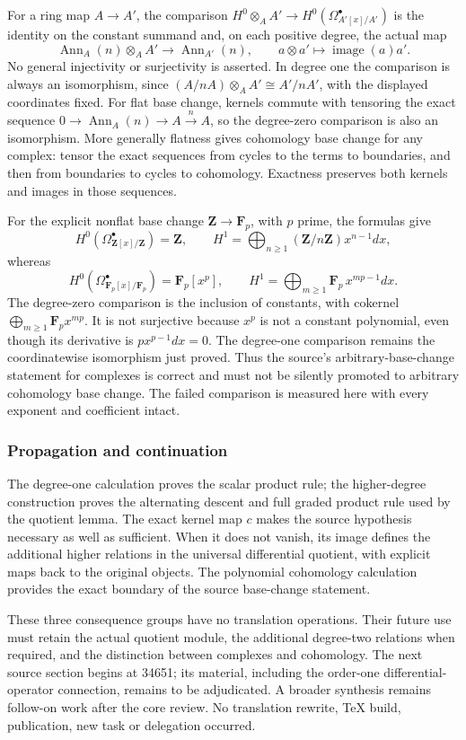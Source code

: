 For a ring map \(A\to A'\), the comparison \(H^0\otimes_A A'\to H^0(\Omega_{A'[x]/A'}^\bullet)\) is the identity on the constant summand and, on each positive degree, the actual map \[
\operatorname{Ann}_A(n)\otimes_A A'\longrightarrow\operatorname{Ann}_{A'}(n),\qquad a\otimes a'\longmapsto\operatorname{image}(a)a'.
\] No general injectivity or surjectivity is asserted. In degree one the comparison is always an isomorphism, since \((A/nA)\otimes_A A'\cong A'/nA'\), with the displayed coordinates fixed. For flat base change, kernels commute with tensoring the exact sequence \(0\to\operatorname{Ann}_A(n)\to A\xrightarrow n A\), so the degree-zero comparison is also an isomorphism. More generally flatness gives cohomology base change for any complex: tensor the exact sequences from cycles to the terms to boundaries, and then from boundaries to cycles to cohomology. Exactness preserves both kernels and images in those sequences.

For the explicit nonflat base change \(\mathbf Z\to\mathbf F_p\), with \(p\) prime, the formulas give \[
H^0(\Omega_{\mathbf Z[x]/\mathbf Z}^\bullet)=\mathbf Z,
\qquad H^1=\bigoplus_{n\ge1}(\mathbf Z/n\mathbf Z)x^{n-1}dx,
\] whereas \[
H^0(\Omega_{\mathbf F_p[x]/\mathbf F_p}^\bullet)=\mathbf F_p[x^p],
\qquad H^1=\bigoplus_{m\ge1}\mathbf F_p\,x^{mp-1}dx.
\] The degree-zero comparison is the inclusion of constants, with cokernel \(\bigoplus_{m\ge1}\mathbf F_p x^{mp}\). It is not surjective because \(x^p\) is not a constant polynomial, even though its derivative is \(p x^{p-1}dx=0\). The degree-one comparison remains the coordinatewise isomorphism just proved. Thus the source's arbitrary-base-change statement for complexes is correct and must not be silently promoted to arbitrary cohomology base change. The failed comparison is measured here with every exponent and coefficient intact.

\subsubsection{Propagation and continuation}\label{algebra-proof-042-propagation-and-continuation}

The degree-one calculation proves the scalar product rule; the higher-degree construction proves the alternating descent and full graded product rule used by the quotient lemma. The exact kernel map \(c\) makes the source hypothesis necessary as well as sufficient. When it does not vanish, its image defines the additional higher relations in the universal differential quotient, with explicit maps back to the original objects. The polynomial cohomology calculation provides the exact boundary of the source base-change statement.

These three consequence groups have no translation operations. Their future use must retain the actual quotient module, the additional degree-two relations when required, and the distinction between complexes and cohomology. The next source section begins at 34651; its material, including the order-one differential-operator connection, remains to be adjudicated. A broader synthesis remains follow-on work after the core review. No translation rewrite, TeX build, publication, new task or delegation occurred.

